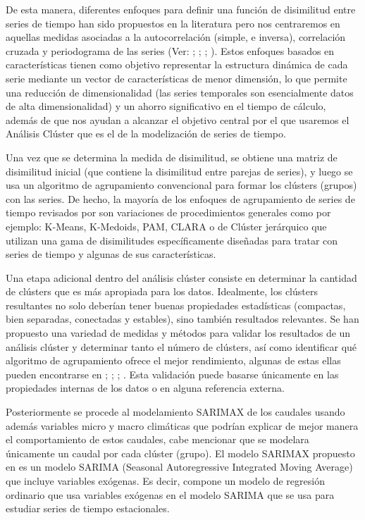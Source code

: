 \documentclass[10pt,a4paper]{article}
\begin{document}
De esta manera, diferentes enfoques para definir una función de disimilitud entre series de tiempo han sido propuestos en la literatura pero nos centraremos en aquellas medidas asociadas a la autocorrelación (simple, e inversa), correlación cruzada y periodograma de las series (Ver: \cite{struzik1999haar};  \cite{galeano2000multivariate}; \cite{caiado2006periodogram}; \cite{chouakria2007adaptive}). Estos enfoques basados en características tienen como objetivo representar la estructura dinámica de cada serie mediante un vector de características de menor dimensión, lo que permite una reducción de dimensionalidad (las series temporales son esencialmente datos de alta dimensionalidad) y un ahorro significativo en el tiempo de cálculo, además de que nos ayudan a alcanzar el objetivo central por el que usaremos el Análisis Clúster que es el de la modelización de series de tiempo.

Una vez que se determina la medida de disimilitud, se obtiene una matriz de disimilitud inicial (que contiene la disimilitud entre parejas de series), y luego se usa un algoritmo de agrupamiento convencional para formar los clústers (grupos) con las series. De hecho, la mayoría de los enfoques de agrupamiento de series de tiempo revisados por \cite{liao2005clustering} son variaciones de procedimientos generales como por ejemplo: K-Means, K-Medoids, PAM, CLARA \cite{kaufman1986clustering} o de Clúster jerárquico que utilizan una gama de disimilitudes específicamente diseñadas para tratar con series de tiempo y algunas de sus características. 

Una etapa adicional dentro del análisis clúster consiste en determinar la cantidad de clústers que es más apropiada para los datos. Idealmente, los clústers resultantes no solo deberían tener buenas propiedades estadísticas (compactas, bien separadas, conectadas y estables), sino también resultados relevantes. Se han propuesto una variedad de medidas y métodos para validar los resultados de un análisis clúster y determinar tanto el número de clústers, así como identificar qué algoritmo de agrupamiento ofrece el mejor rendimiento, algunas de estas ellas pueden encontrarse en \cite{fraley1998many}; \cite{duda2001pattern} ; \cite{salvador2004determining} ; \cite{kerr2001bootstrapping}. Esta validación puede basarse únicamente en las propiedades internas de los datos o en alguna referencia externa.

Posteriormente se procede al modelamiento SARIMAX de los caudales usando además variables micro y macro climáticas que podrían explicar de mejor manera el comportamiento de estos caudales, cabe mencionar que se modelara únicamente un caudal por cada clúster (grupo).
El modelo SARIMAX propuesto en \cite{box2015time} es un modelo SARIMA (Seasonal Autoregressive Integrated Moving Average) que incluye variables exógenas. Es decir, compone un modelo de regresión ordinario que usa variables exógenas en el modelo SARIMA que se usa para estudiar series de tiempo estacionales.
\end{document}

